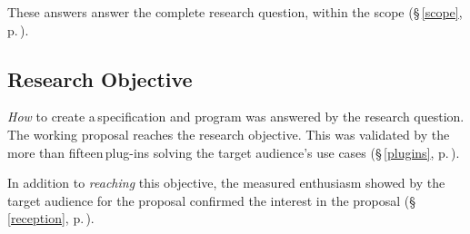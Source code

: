 These answers answer the complete research question, within the scope
  (§\,\ref{scope}, p.\,\pageref{scope}).

\subsection{Research Objective}\label{q-research-objective}

\emph{How} to create a\,specification and program was answered by the research
  question.
The working proposal reaches the research objective.
This was validated by the more than fifteen\,plug-ins solving the target
  audience's use cases (§\,\ref{plugins}, p.\,\pageref{plugins}).

In addition to \emph{reaching} this objective, the measured enthusiasm
  showed by the target audience for the proposal confirmed the interest in
  the proposal (§\,\ref{reception}, p.\,\pageref{reception}).
